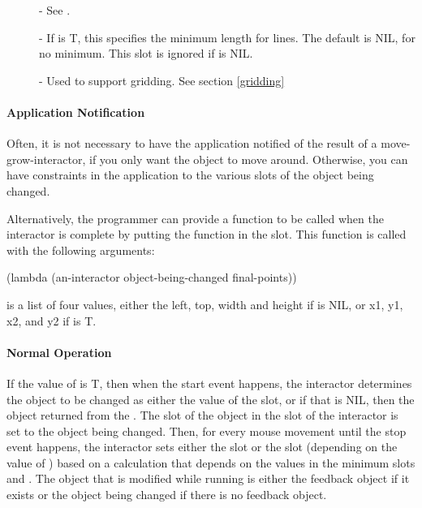 \begin{description}
\item[] 
- See .

\item[] 
- If  is T, this specifies the minimum length for lines.  The
default is NIL, for no minimum.  This slot is ignored if  is NIL.

\item[] 
- Used to support gridding.  See section \ref{gridding}
\end{description}


\paragraph{Application Notification}

Often, it is not necessary to have the application notified of the result
of a move-grow-interactor, if you only want the object to move around.
Otherwise, you can have constraints in the application to the various slots
of the object being changed.

Alternatively, the programmer can provide a function to be called when the
interactor is complete by putting the function in the 
slot.  This function is called with the following arguments:
\begin{programexample}
(lambda (an-interactor object-being-changed final-points))
\end{programexample}
 is a list of four values, either the left, top, width and
height if  is NIL, or x1, y1, x2, and y2 if  is T.

\paragraph{Normal Operation}

If the value of  is T,
then when the start event happens, the interactor determines the object to
be changed as
either the value of the  slot, or if that is NIL, then
the object returned from the .
The  slot of the object in
the  slot of the interactor is set to the object being changed.
Then, for every mouse movement until the stop event happens, the interactor sets
either the  slot or the  slot (depending on the value
of ) based on a calculation that depends on the values in the
minimum slots and .  The object that is modified while
running is either the feedback object if it exists or the object being changed
if there is no feedback object.

